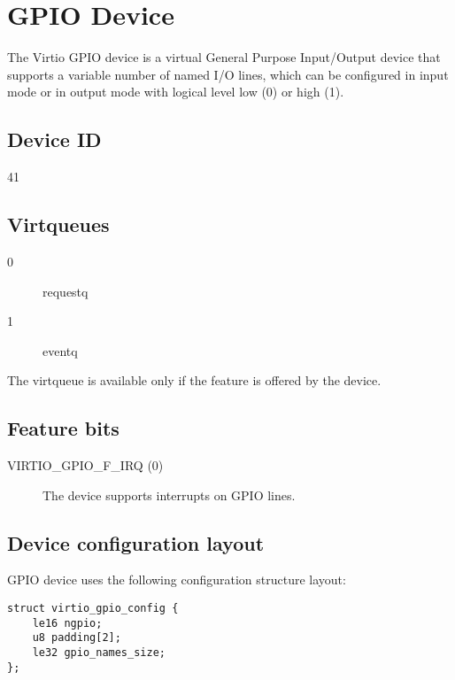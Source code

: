 \section{GPIO Device}\label{sec:Device Types / GPIO Device}

The Virtio GPIO device is a virtual General Purpose Input/Output device that
supports a variable number of named I/O lines, which can be configured in input
mode or in output mode with logical level low (0) or high (1).

\subsection{Device ID}\label{sec:Device Types / GPIO Device / Device ID}
41

\subsection{Virtqueues}\label{sec:Device Types / GPIO Device / Virtqueues}

\begin{description}
\item[0] requestq
\item[1] eventq
\end{description}

The  virtqueue is available only if the 
feature is offered by the device.

\subsection{Feature bits}\label{sec:Device Types / GPIO Device / Feature bits}

\begin{description}
\item[VIRTIO_GPIO_F_IRQ (0)] The device supports interrupts on GPIO lines.
\end{description}

\subsection{Device configuration layout}\label{sec:Device Types / GPIO Device / Device configuration layout}

GPIO device uses the following configuration structure layout:

\begin{lstlisting}
struct virtio_gpio_config {
    le16 ngpio;
    u8 padding[2];
    le32 gpio_names_size;
};
\end{lstlisting}

